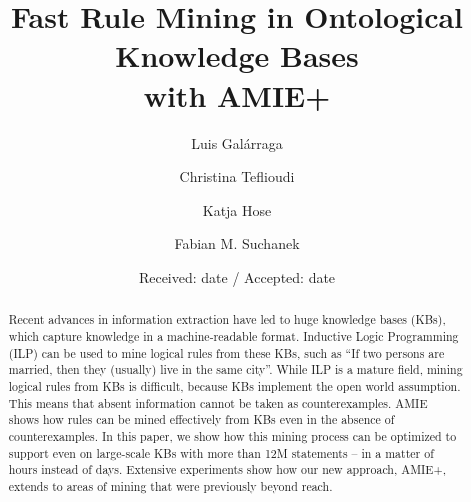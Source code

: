 \title{Fast Rule Mining in Ontological Knowledge Bases\\ with AMIE+}


\author{Luis Gal\'arraga\and
        Christina Teflioudi \and Katja Hose \and Fabian M. Suchanek
}



\date{Received: date / Accepted: date}


\maketitle

\begin{abstract}
Recent advances in information extraction have led to huge knowledge bases (KBs), which capture knowledge in a ma\-chine-readable format.
Inductive Logic Programming (ILP) can be used to mine logical rules from these KBs, such as ``If two persons are married, then they (usually) live in the same city''.
While ILP is a mature field, mining logical rules from KBs is difficult, because KBs implement the open world assumption.
This means that absent information cannot be taken as counterexamples.
AMIE~\cite{amie} shows how rules can be mined effectively from KBs even in the absence of counterexamples.
In this paper, we show how this mining process can be optimized to support even on large-scale KBs with more than 12M statements -- in a matter of hours instead of days.
Extensive experiments show how our new approach, AMIE+, extends to areas of mining that were previously beyond reach.
\end{abstract}


